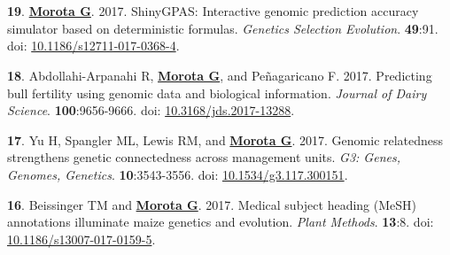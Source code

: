\documentclass[margin,line,10pt]{res}
\newenvironment{list1}{
  \begin{list}{\ding{113}}{%
      \setlength{\itemsep}{0in}
      \setlength{\parsep}{0in} \setlength{\parskip}{0in}
      \setlength{\topsep}{0in} \setlength{\partopsep}{0in} 
      \setlength{\leftmargin}{0.17in}}}{\end{list}}
\begin{document}
\begin{resume}
\begin{list1}
\end{list1}


\section{}

\begin{list1}

\item  [{\bf 19}.] \textbf{\underline{Morota G}}. 2017. ShinyGPAS: Interactive genomic prediction accuracy simulator based on deterministic formulas. \emph{Genetics Selection Evolution}. \textbf{49}:91. doi: \textcolor{blue}{\href{https://dx.doi.org/10.1186/s12711-017-0368-4}{10.1186/s12711-017-0368-4}}.

  \vspace{0.5cm}
    
\item  [{\bf 18}.] Abdollahi-Arpanahi R, \textbf{\underline{Morota G}}, and  Pe\~{n}agaricano F. 2017. Predicting bull fertility using genomic data and biological information. \emph{Journal of Dairy Science}. \textbf{100}:9656-9666. doi: \textcolor{blue}{\href{https://doi.org/10.3168/jds.2017-13288}{10.3168/jds.2017-13288}}.

    \vspace{0.5cm}
    
  \item  [{\bf 17}.]  Yu H, Spangler ML, Lewis RM, and \textbf{\underline{Morota G}}. 2017. Genomic relatedness strengthens genetic connectedness across management units. \emph{G3: Genes, Genomes, Genetics}. \textbf{10}:3543-3556. doi: \textcolor{blue}{\href{https://doi.org/10.1534/g3.117.300151}{10.1534/g3.117.300151}}.

    \vspace{0.5cm}
    
\item [{\bf 16}.] Beissinger TM and \textbf{\underline{Morota G}}. 2017. Medical subject heading (MeSH) annotations illuminate maize genetics and evolution. \emph{Plant Methods}. \textbf{13}:8. doi: \textcolor{blue}{\href{http://dx.doi.org/10.1186/s13007-017-0159-5}{10.1186/s13007-017-0159-5}}.

\end{list1}



\section{}


\end{resume}
\end{document}
